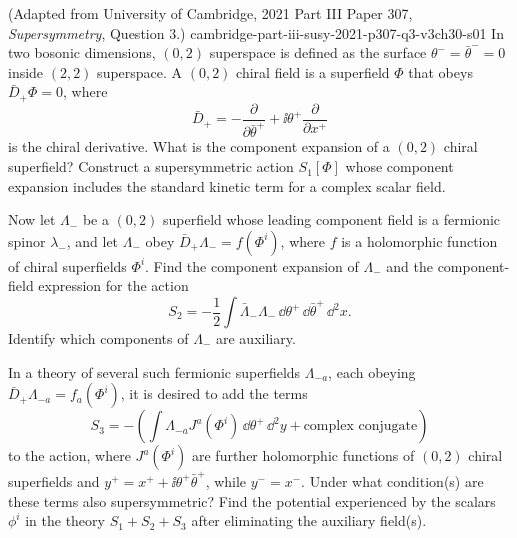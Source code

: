 
\begin{enumerate}
    {(Adapted from University of Cambridge, 2021 Part III Paper 307, \emph{Supersymmetry}, Question 3.)}
    {cambridge-part-iii-susy-2021-p307-q3-v3ch30-s01}
  In two bosonic dimensions, \((0,2)\) superspace is defined as the surface
  \(\theta^- = \bar\theta^- = 0\) inside \((2,2)\) superspace.  A \((0,2)\)
  chiral field is a superfield \(\Phi\) that obeys \(\bar D_+\Phi=0\), where
  \[
    \bar D_+=-\frac{\partial}{\partial\bar\theta^+}
      +\ii\theta^+\frac{\partial}{\partial x^+}
  \]
  is the chiral derivative.  What is the component expansion of a \((0,2)\)
  chiral superfield?  Construct a supersymmetric action \(S_1[\Phi]\) whose
  component expansion includes the standard kinetic term for a complex
  scalar field.

  Now let \(\Lambda_-\) be a \((0,2)\) superfield whose leading component
  field is a fermionic spinor \(\lambda_-\), and let \(\Lambda_-\) obey
  \(\bar D_+\Lambda_-=f(\Phi^i)\), where \(f\) is a holomorphic function of
  chiral superfields \(\Phi^i\).  Find the component expansion of \(\Lambda_-\)
  and the component-field expression for the action
  \[
    S_2=-\frac12\int \bar\Lambda_-\Lambda_-\,
      \dd\theta^+\,\dd\bar\theta^+\,\dd^2x.
  \]
  Identify which components of \(\Lambda_-\) are auxiliary.

  In a theory of several such fermionic superfields \(\Lambda_{-a}\), each
  obeying \(\bar D_+\Lambda_{-a}=f_a(\Phi^i)\), it is desired to add the terms
  \[
    S_3=-\left(\int \Lambda_{-a}J^a(\Phi^i)\,
      \dd\theta^+\,\dd^2y+\text{complex conjugate}\right)
  \]
  to the action, where \(J^a(\Phi^i)\) are further holomorphic functions of
  \((0,2)\) chiral superfields and
  \(y^+=x^++\ii\theta^+\bar\theta^+\), while \(y^-=x^-\).  Under what
  condition(s) are these terms also supersymmetric?  Find the potential
  experienced by the scalars \(\phi^i\) in the theory \(S_1+S_2+S_3\) after
  eliminating the auxiliary field(s).


\end{enumerate}
